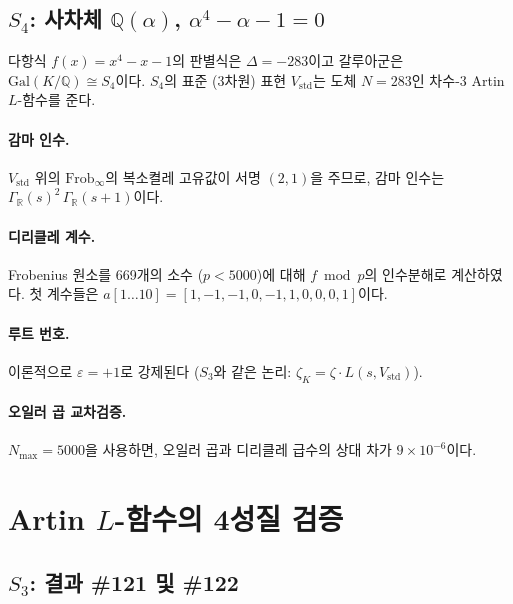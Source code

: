 \documentclass[11pt, a4paper]{article}
\theoremstyle{plain}
\theoremstyle{definition}
\newcommand{\Gal}{\mathrm{Gal}}       %
\newcommand{\Frob}{\mathrm{Frob}}     %
\begin{document}
\subsection{$S_{4}$: 사차체 $\mathbb{Q}(\alpha)$, $\alpha^{4}-\alpha-1=0$}
\label{sec:s4-setup}

다항식 $f(x) = x^{4}-x-1$의 판별식은 $\Delta = -283$이고
갈루아군은 $\Gal(K/\mathbb{Q}) \cong S_{4}$이다. $S_{4}$의 표준
(3차원) 표현 $V_{\mathrm{std}}$는 도체 $N = 283$인
차수-3 Artin $L$-함수를 준다.

\paragraph{감마 인수.}
$V_{\mathrm{std}}$ 위의 $\Frob_{\infty}$의 복소켤레 고유값이
서명 $(2,1)$을 주므로, 감마 인수는
$\Gamma_{\mathbb{R}}(s)^{2}\,\Gamma_{\mathbb{R}}(s+1)$이다.

\paragraph{디리클레 계수.}
Frobenius 원소를 669개의 소수 ($p < 5000$)에 대해 $f \bmod p$의
인수분해로 계산하였다. 첫 계수들은
$a[1\ldots10] = [1, -1, -1, 0, -1, 1, 0, 0, 0, 1]$이다.

\paragraph{루트 번호.}
이론적으로 $\varepsilon = +1$로 강제된다
($S_{3}$와 같은 논리: $\zeta_{K} = \zeta \cdot L(s,V_{\mathrm{std}})$).

\paragraph{오일러 곱 교차검증.}
$N_{\max}=5000$을 사용하면, 오일러 곱과 디리클레 급수의 상대 차가
$9 \times 10^{-6}$이다.


\section{Artin $L$-함수의 4성질 검증}
\label{sec:artin-verify}

\subsection{$S_{3}$: 결과 \#121 및 \#122}
\label{sec:s3-results}
\end{document}
